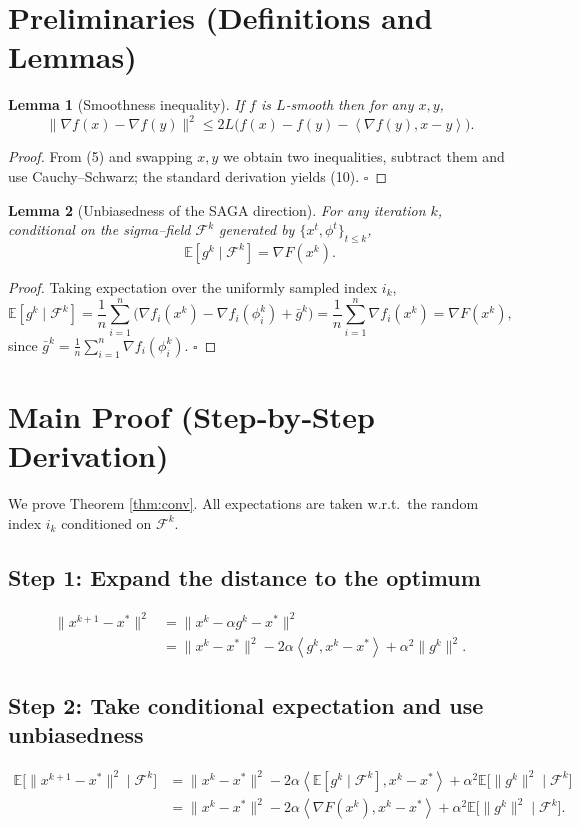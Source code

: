 \documentclass{article}
\newtheorem{lemma}{Lemma}
\newcommand{\E}{\mathbb{E}}
\newcommand{\inner}[2]{\left\langle #1,#2\right\rangle}
\newcommand{\grad}{\nabla}
\begin{document}
\section*{Preliminaries (Definitions and Lemmas)}
\begin{lemma}[Smoothness inequality]\label{lem:smooth}
If $f$ is $L$‑smooth then for any $x,y$,
\[
\|\grad f(x)-\grad f(y)\|^{2}\le 2L\bigl(f(x)-f(y)-\inner{\grad f(y)}{x-y}\bigr).
\tag{10}
\]
\end{lemma}
\begin{proof}
From (5) and swapping $x,y$ we obtain two inequalities, subtract them and use Cauchy–Schwarz; the standard derivation yields (10). \hfill$\square$
\end{proof}

\begin{lemma}[Unbiasedness of the SAGA direction]\label{lem:unbiased}
For any iteration $k$, conditional on the sigma–field $\mathcal{F}^{k}$ generated by $\{x^{t},\phi^{t}\}_{t\le k}$,
\[
\E\!\left[g^{k}\mid\mathcal{F}^{k}\right]=\grad F(x^{k}).
\tag{11}
\]
\end{lemma}
\begin{proof}
Taking expectation over the uniformly sampled index $i_k$,
\[
\E[g^{k}\mid\mathcal{F}^{k}]
= \frac1n\sum_{i=1}^{n}\bigl(\grad f_i(x^{k})-\grad f_i(\phi_i^{k})+\bar g^{k}\bigr)
= \frac1n\sum_{i=1}^{n}\grad f_i(x^{k}) = \grad F(x^{k}),
\]
since $\bar g^{k}= \frac1n\sum_{i=1}^{n}\grad f_i(\phi_i^{k})$. \hfill$\square$
\end{proof}

\section*{Main Proof (Step‑by‑Step Derivation)}
We prove Theorem \ref{thm:conv}. All expectations are taken w.r.t.\ the random index $i_k$ conditioned on $\mathcal{F}^{k}$.

\subsection*{Step 1: Expand the distance to the optimum}
\[
\begin{aligned}
\|x^{k+1}-x^{*}\|^{2}
&= \|x^{k}-\alpha g^{k}-x^{*}\|^{2} \\
&= \|x^{k}-x^{*}\|^{2}
-2\alpha\inner{g^{k}}{x^{k}-x^{*}}
+\alpha^{2}\|g^{k}\|^{2}.
\tag{12}
\end{aligned}
\]

\subsection*{Step 2: Take conditional expectation and use unbiasedness}
\[
\begin{aligned}
\E\!\bigl[\|x^{k+1}-x^{*}\|^{2}\mid\mathcal{F}^{k}\bigr]
&= \|x^{k}-x^{*}\|^{2}
-2\alpha\inner{\E[g^{k}\mid\mathcal{F}^{k}]}{x^{k}-x^{*}}
+\alpha^{2}\E\!\bigl[\|g^{k}\|^{2}\mid\mathcal{F}^{k}\bigr]  \\
&= \|x^{k}-x^{*}\|^{2}
-2\alpha\inner{\grad F(x^{k})}{x^{k}-x^{*}}
+\alpha^{2}\E\!\bigl[\|g^{k}\|^{2}\mid\mathcal{F}^{k}\bigr].
\tag{13}
\end{aligned}
\]
\end{document}
